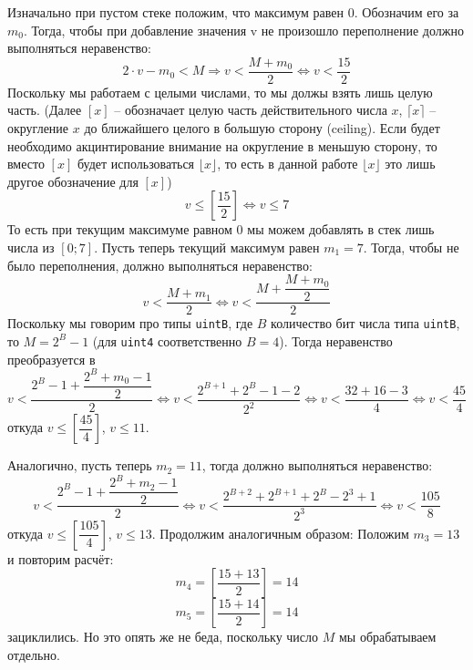 Изначально при пустом стеке положим, что максимум равен \(0\). Обозначим его за \(m_0\). Тогда, чтобы при добавление значения v не произошло переполнение должно выполняться неравенство:
\begin{dmath*}
2\cdot v - m_0 < M \Rightarrow v < \dfrac{M + m_0}{2} 
\Leftrightarrow  v  < \dfrac{15}{2}
\end{dmath*}
Поскольку мы работаем с целыми числами, то мы должы взять лишь целую часть. (Далее \([x]\) -- обозначает целую часть действительного числа \(x\), \(\lceil x \rceil\) -- округление \(x\) до ближайшего целого в большую сторону (ceiling). Если будет необходимо акцинтирование внимание на округление в меньшую сторону, то вместо \([x]\) будет использоваться \(\lfloor x \rfloor\), то есть в данной работе \(\lfloor x \rfloor\) это лишь другое обозначение для \([x]\))
\begin{dmath*}
v \le \left[ \dfrac{15}{2}\right] \Leftrightarrow v \le 7
\end{dmath*}
То есть при текущим максимуме равном \(0\) мы можем добавлять в стек лишь числа из \([0;7]\). Пусть теперь текущий максимум равен \(m_1 = 7\). Тогда, чтобы не было переполнения, должно выполняться неравенство:
\begin{dmath*}
v < \dfrac{M + m_1}{2} \Leftrightarrow v < \dfrac{M + \dfrac{M + m_0}{2}}{2}
\end{dmath*}
Поскольку мы говорим про типы \texttt{uintB}, где \(B\) количество бит числа типа \texttt{uintB}, то \(M = 2^{B} - 1\) (для \texttt{uint4} соответственно \(B =4\)). Тогда неравенство преобразуется в 
\begin{dmath*}
    v <  \dfrac{2^{B} - 1 + \dfrac{2^B + m_0 - 1}{2}}{2} 
    \Leftrightarrow
    v <  \dfrac{2^{B+1} + 2^B -1 -2}{2^2}
    \Leftrightarrow  
    v < \dfrac{32 + 16 - 3}{4}
    \Leftrightarrow
    v < \dfrac{45}{4}
\end{dmath*}
откуда \(v \le \left[ \dfrac{45}{4}\right]\), \(v \le 11\). 


Аналогично, пусть теперь \(m_2 = 11\), тогда должно выполняться неравенство:
\begin{dmath*}
v <  \dfrac{2^{B} - 1 + \dfrac{2^B + m_2 - 1}{2}}{2} 
 \Leftrightarrow
  v <  \dfrac{2^{B+2} + 2^{B+1} + 2^B - 2^3 +1}{2^3}
\Leftrightarrow v < \dfrac{105}{8}
\end{dmath*}
откуда \(v \le \left[ \dfrac{105}{4}\right]\), \(v \le 13\).
Продолжим аналогичным образом:
Положим \(m_3 = 13\) и повторим расчёт:
\begin{dmath*}
m_4 = \left[\dfrac{15 + 13}{2}\right] = 14
\end{dmath*}
\begin{dmath*}
m_5 = \left[\dfrac{15+14}{2}\right] = 14
\end{dmath*}
зациклились. Но это опять же не беда, поскольку число \(M\) мы обрабатываем отдельно.

